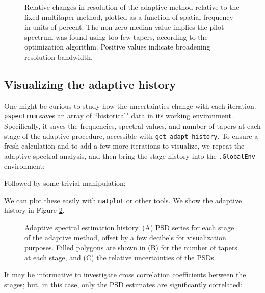 \documentclass[10pt]{article}\usepackage[]{graphicx}\usepackage[]{color}
\newcommand{\Rcmd}[1]{\texttt{#1}}
\begin{document}
\begin{figure}[!htbp]
\begin{center}

\caption{Relative changes in resolution of the adaptive method
relative to the fixed multitaper method, plotted
as a function of spatial frequency in units of percent. 
The non-zero median value implies the pilot spectrum was found using too-few tapers,
according to the optimization algorithm.  Positive values indicate broadening
resolution bandwidth.
}
\label{fig:magres}
\end{center}
\end{figure}

\subsection{Visualizing the adaptive history}
One might be curious to study how the
uncertainties change with each iteration.
\Rcmd{pspectrum}
 saves an array of ``historical" data in its working environment.
 Specifically, it saves the frequencies,
 spectral values, and number of tapers at each stage of the adaptive
 procedure, accessible with \Rcmd{get\_adapt\_history}.
 To ensure a fresh calculation and to 
 add a few more iterations to visualize, 
we repeat the adaptive spectral analysis, 
and then bring the stage history into the \Rcmd{.GlobalEnv} environment:

Followed by some trivial manipulation:

We can plot these easily with \Rcmd{matplot} or other tools.  We show
the adaptive history in
Figure \ref{fig:psdhist}.  

\begin{figure}[!htbp]
\begin{center}




\caption{Adaptive spectral estimation history.
(A) PSD series for each stage of the adaptive method, 
offset by a few decibels for visualization purposes.
Filled polygons are shown in (B) for the number of tapers at each stage,
and (C) the relative uncertainties of the PSDs.
}
\label{fig:psdhist}
\end{center}
\end{figure}

It may be informative to investigate cross correlation
coefficients between the stages;
but, in this case, only the PSD estimates are significantly correlated:


\end{document}
